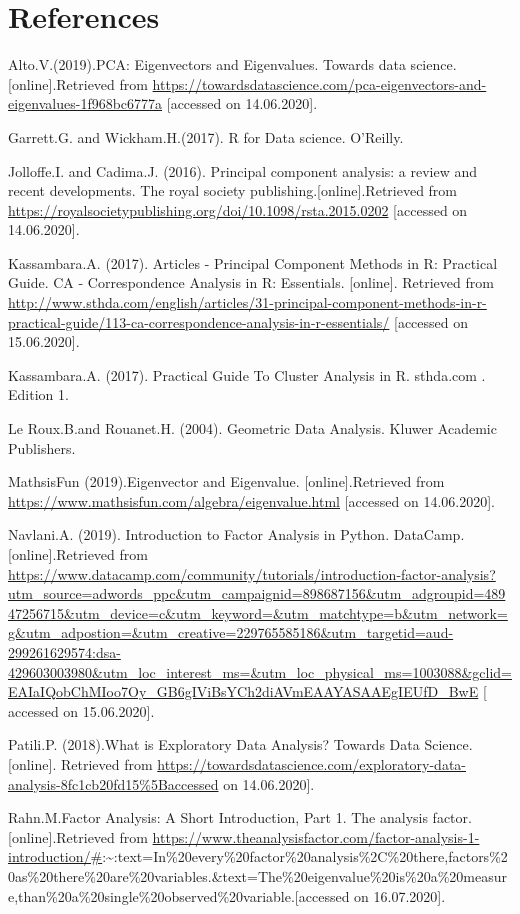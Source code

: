 \documentclass[]{book}
\begin{document}
\hypertarget{references}{%
\section{References}\label{references}}

Alto.V.(2019).PCA: Eigenvectors and Eigenvalues. Towards data science. {[}online{]}.Retrieved from \url{https://towardsdatascience.com/pca-eigenvectors-and-eigenvalues-1f968bc6777a} {[}accessed on 14.06.2020{]}.

Garrett.G. and Wickham.H.(2017). R for Data science. O'Reilly.

Jolloffe.I. and Cadima.J. (2016). Principal component analysis: a review and recent developments. The royal society publishing.{[}online{]}.Retrieved from \url{https://royalsocietypublishing.org/doi/10.1098/rsta.2015.0202} {[}accessed on 14.06.2020{]}.

Kassambara.A. (2017). Articles - Principal Component Methods in R: Practical Guide. CA - Correspondence Analysis in R: Essentials. {[}online{]}. Retrieved from \url{http://www.sthda.com/english/articles/31-principal-component-methods-in-r-practical-guide/113-ca-correspondence-analysis-in-r-essentials/} {[}accessed on 15.06.2020{]}.

Kassambara.A. (2017). Practical Guide To Cluster Analysis in R. sthda.com . Edition 1.

Le Roux.B.and Rouanet.H. (2004). Geometric Data Analysis. Kluwer Academic Publishers.

MathsisFun (2019).Eigenvector and Eigenvalue. {[}online{]}.Retrieved from \url{https://www.mathsisfun.com/algebra/eigenvalue.html} {[}accessed on 14.06.2020{]}.

Navlani.A. (2019). Introduction to Factor Analysis in Python. DataCamp. {[}online{]}.Retrieved from \url{https://www.datacamp.com/community/tutorials/introduction-factor-analysis?utm_source=adwords_ppc\&utm_campaignid=898687156\&utm_adgroupid=48947256715\&utm_device=c\&utm_keyword=\&utm_matchtype=b\&utm_network=g\&utm_adpostion=\&utm_creative=229765585186\&utm_targetid=aud-299261629574:dsa-429603003980\&utm_loc_interest_ms=\&utm_loc_physical_ms=1003088\&gclid=EAIaIQobChMIoo7Oy_GB6gIViBsYCh2diAVmEAAYASAAEgIEUfD_BwE} {[} accessed on 15.06.2020{]}.

Patili.P. (2018).What is Exploratory Data Analysis? Towards Data Science. {[}online{]}. Retrieved from \url{https://towardsdatascience.com/exploratory-data-analysis-8fc1cb20fd15\%5Baccessed} on 14.06.2020{]}.

Rahn.M.Factor Analysis: A Short Introduction, Part 1. The analysis factor.{[}online{]}.Retrieved from \url{https://www.theanalysisfactor.com/factor-analysis-1-introduction/\#}:\textasciitilde{}:text=In\%20every\%20factor\%20analysis\%2C\%20there,factors\%20as\%20there\%20are\%20variables.\&text=The\%20eigenvalue\%20is\%20a\%20measure,than\%20a\%20single\%20observed\%20variable.{[}accessed on 16.07.2020{]}.
\end{document}
